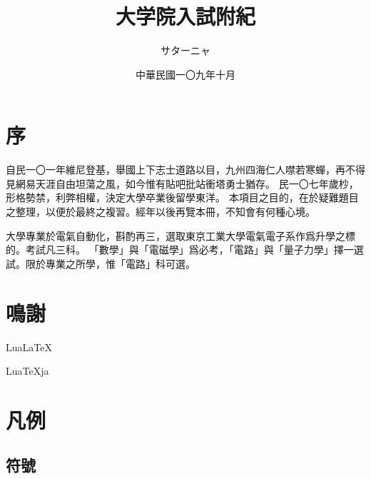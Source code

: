 \documentclass[11pt]{ltjtreport}
\title{大学院入試附紀}
\author{サターニャ}
\date{中華民國一〇九年十月}
\begin{document}
\maketitle
\chapter*{序}
自民一〇一年維尼登基，舉國上下志士道路以目，九州四海仁人噤若寒蟬，再不得見網易天涯自由坦蕩之風，如今惟有貼吧批站衝塔勇士猶存。
民一〇七年歲杪，形格勢禁，利弊相權，決定大學卒業後留學東洋。
本項目之目的，在於疑難題目之整理，以便於最終之複習。經年以後再覽本冊，不知會有何種心境。

大學專業於電氣自動化，斟酌再三，選取東京工業大學電氣電子系作爲升學之標的。考試凡三科。
「數學」與「電磁學」爲必考，「電路」與「量子力學」擇一選試。限於專業之所學，惟「電路」科可選。



\chapter*{鳴謝}
Lua\LaTeX

Lua\TeX ja

\chapter{凡例}
\section{符號}
\end{document}
